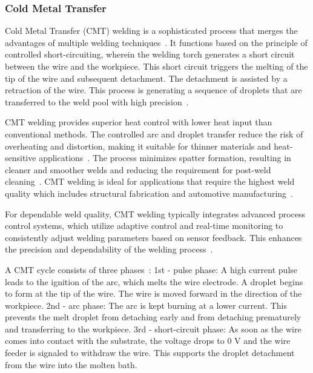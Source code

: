 \subsubsection{Cold Metal Transfer}\label{CMTc}


Cold Metal Transfer (\acrshort{CMT}) welding is a sophisticated process that merges the advantages of multiple welding techniques~\cite{Dutra.2015}. It functions based on the principle of controlled short-circuiting, wherein the welding torch generates a short circuit between the wire and the workpiece. This short circuit triggers the melting of the tip of the wire and subsequent detachment. The detachment is assisted by a retraction of the wire. This process is generating a sequence of droplets that are transferred to the weld pool with high precision~\cite{Selvi.2018, Srinivasan.2022}.

\acrshort{CMT} welding provides superior heat control with lower heat input than conventional methods. The controlled arc and droplet transfer reduce the risk of overheating and distortion, making it suitable for thinner materials and heat-sensitive applications~\cite{Scotti.2020}. The process minimizes spatter formation, resulting in cleaner and smoother welds and reducing the requirement for post-weld cleaning~\cite{Srinivasan.2022}. %
\acrshort{CMT} welding is ideal for applications that require the highest weld quality which includes structural fabrication and automotive manufacturing~\cite{Cong.2016}.

For dependable weld quality, \acrshort{CMT} welding typically integrates advanced process control systems, which utilize adaptive control and real-time monitoring to consistently adjust welding parameters based on sensor feedback. This enhances the precision and dependability of the welding process~\cite{Pickin.2006}.

A \acrshort{CMT} cycle consists of three phases~\cite{Selvi.2018}:\newline
1st - pulse phase: A high current pulse leads to the ignition of the arc, 
which melts the wire electrode. A droplet begins to form at the 
tip of the wire. The wire is moved forward in the direction of the 
workpiece.\newline
2nd - arc phase: The arc is kept burning at a lower current. This prevents the melt droplet from detaching early and 
from detaching prematurely and transferring to the workpiece.\newline
3rd - short-circuit phase: As soon as the wire comes into contact with the substrate, 
the voltage drops to 0 V and the wire feeder is signaled to withdraw the wire. This supports the droplet detachment 
from the wire into the molten bath.

